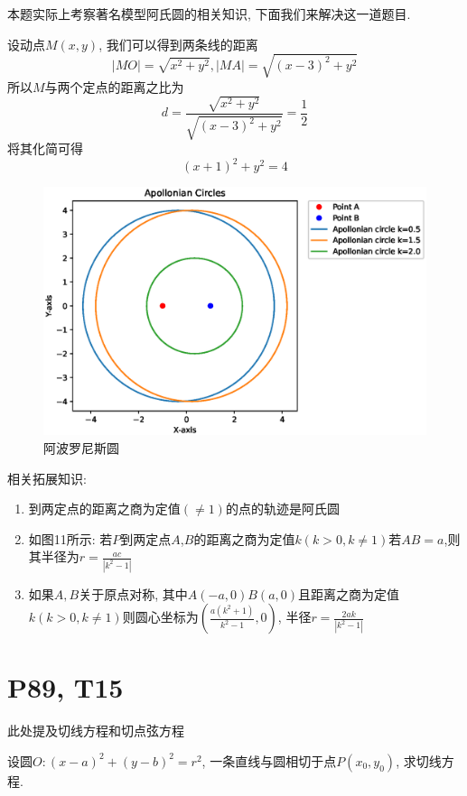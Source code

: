 \documentclass{book}
\begin{document}
        本题实际上考察著名模型\textcolor[rgb]{0.38,0.11,0.2}{阿氏圆}的相关知识, 下面我们来解决这一道题目.

        设动点$M\left( x,y \right)$, 我们可以得到两条线的距离$$|MO|=\sqrt{x^2+y^2},|MA|=\sqrt{\left( x-3 \right)^2+y^2}$$
        所以$M$与两个定点的距离之比为$$d=\frac{\sqrt{x^2+y^2}}{\sqrt{\left( x-3 \right)^2+y^2}}=\frac{1}{2}$$
        将其化简可得$$\left( x+1 \right)^2+y^2=4$$
        \begin{figure}[htbp]
            \centering
            \includegraphics[width=\textwidth]{img/ApollonianCircles.eps}
            \caption{阿波罗尼斯圆}
        \end{figure}

        相关拓展知识:

        \begin{enumerate}
            \item 到两定点的距离之商为定值$(\neq 1)$的点的轨迹是阿氏圆
            \item 如图11所示: 若$P$到两定点$A$,$B$的距离之商为定值$k(k>0,k\neq1)$若$AB=a$,则其半径为$\displaystyle r=\frac{ac}{\left| k^2-1 \right|}$
            \item 如果$A,B$关于原点对称, 其中$A(-a,0)B(a,0)$且距离之商为定值$k(k>0,k\neq 1)$则圆心坐标为$\displaystyle \left( \frac{a\left( k^2+1 \right)}{k^2-1},0 \right)$, 半径$\displaystyle r=\frac{2ak}{\left| k^2-1 \right|}$
        \end{enumerate}
        \section{\textcolor[rgb]{0.11,0.65,0.52}{P89, T15}}
        此处提及\textcolor[rgb]{0.38,0.11,0.2}{切线方程}和\textcolor[rgb]{0.38,0.11,0.2}{切点弦方程}
        \begin{boxB}
            设圆$\displaystyle O:\left( x-a \right)^2+\left( y-b \right)^2=r^2$, 一条直线与圆相切于点$P\left( x_0,y_0 \right)$, 求切线方程.
        \end{boxB}
\end{document}
